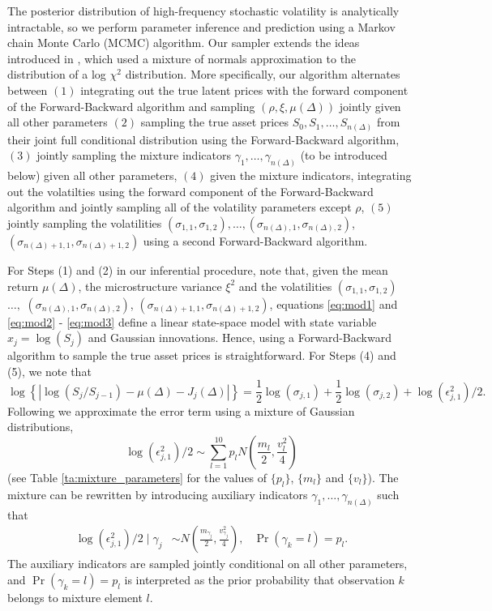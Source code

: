 The posterior distribution of high-frequency stochastic volatility is analytically intractable, so we perform parameter inference and prediction using a Markov chain Monte Carlo (MCMC) algorithm.  Our sampler extends the ideas introduced in \cite{omori2007stochastic}, which used a mixture of normals approximation to the distribution of a log $\chi^2$ distribution.  More specifically, our algorithm alternates between $(1)$ integrating out the true latent prices with the forward component of the Forward-Backward algorithm \cite{carter1994gibbs,fruhwirth1994data} and sampling $(\rho, \xi, \mu(\Delta))$ jointly given all other parameters $(2)$ sampling the true asset prices $S_0, S_1, \ldots, S_{n(\Delta)}$ from their joint full conditional distribution using the Forward-Backward algorithm, $(3)$ jointly sampling the mixture indicators $\gamma_1, \ldots, \gamma_{n(\Delta)}$ (to be introduced below) given all other parameters, $(4)$ given the mixture indicators, integrating out the volatilties using the forward component of the Forward-Backward algorithm and jointly sampling all of the volatility parameters except $\rho$, $(5)$ jointly sampling the volatilities $(\sigma_{1,1},\sigma_{1,2}), \ldots, (\sigma_{n(\Delta),1}, \sigma_{n(\Delta),2})$, $(\sigma_{n(\Delta) + 1,1}, \sigma_{n(\Delta) + 1,2})$ using a second Forward-Backward algorithm.

For Steps (1) and (2) in our inferential procedure, note that, given the mean return $\mu(\Delta)$, the microstructure variance $\xi^2$ and the volatilities $(\sigma_{1,1},\sigma_{1,2})$ $\ldots,$ $(\sigma_{n(\Delta),1}, \sigma_{n(\Delta),2})$, $(\sigma_{n(\Delta) + 1,1}, \sigma_{n(\Delta) + 1,2})$, equations \eqref{eq:mod1} and \eqref{eq:mod2} - \eqref{eq:mod3} define a linear state-space model with state variable $x_j = \log (S_j)$ and Gaussian innovations.  Hence, using a Forward-Backward algorithm to sample the true asset prices is straightforward.  For Steps (4) and (5), we note that
\[
\log\left\{ | \log(S_j / S_{j -1}) - \mu(\Delta) - J_j(\Delta) | \right\} = \frac{1}{2}\log(\sigma_{j,1}) + \frac{1}{2}\log(\sigma_{j,2}) + \log( \epsilon^2_{j,1} )/2 .
\]
Following \cite{omori2007stochastic} we approximate the error term using a mixture of Gaussian distributions,
$$
\log( \epsilon^2_{j,1} )/2 \sim \sum_{l=1}^{10} p_l N \left( \frac{m_l}{2}, \frac{v_l^2}{4} \right)
$$
(see Table \ref{ta:mixture_parameters} for the values of $\{ p_l \}$, $\{ m_l \}$ and $\{ v_l \}$).  The mixture can be rewritten by introducing auxiliary indicators $\gamma_1, \ldots, \gamma_{n(\Delta)}$ such that
\begin{align*}
\log( \epsilon^2_{j,1} )/2 \mid \gamma_j &\sim N \left( \frac{m_{\gamma_j}}{2}, \frac{v_{\gamma_j}^2}{4} \right)   ,   &   \Pr(\gamma_k = l) = p_l .
\end{align*}
The auxiliary indicators are sampled jointly conditional on all other parameters, and $\Pr(\gamma_k = l) = p_l$ is interpreted as the prior probability that observation $k$ belongs to mixture element $l$.

